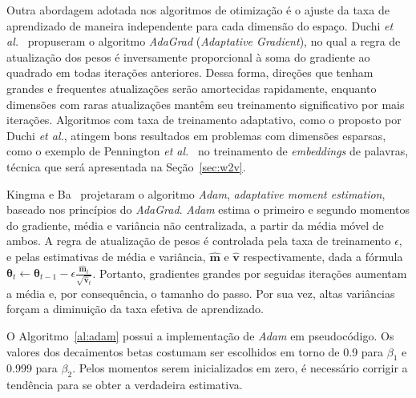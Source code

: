Outra abordagem adotada nos algoritmos de otimização é o ajuste da taxa de aprendizado de maneira independente para cada dimensão do espaço. Duchi \textit{et al.}~\cite{duchi11} propuseram o algoritmo \textit{AdaGrad} (\textit{Adaptative Gradient}), no qual a regra de atualização dos pesos é inversamente proporcional à soma do gradiente ao quadrado em todas iterações anteriores. Dessa forma, direções que tenham grandes e frequentes atualizações serão amortecidas rapidamente, enquanto dimensões com raras atualizações mantêm seu treinamento significativo por mais iterações. Algoritmos com taxa de treinamento adaptativo, como o proposto por Duchi \textit{et al.}, atingem bons resultados em problemas com dimensões esparsas, como o exemplo de Pennington \textit{et al.}~\cite{pennington14} no treinamento de \textit{embeddings} de palavras, técnica que será apresentada na Seção~\ref{sec:w2v}.

Kingma e Ba~\cite{kingma14} projetaram o algoritmo \textit{Adam}, \textit{adaptative moment estimation}, baseado nos princípios do \textit{AdaGrad}. \textit{Adam} estima o primeiro e segundo momentos do gradiente, média e variância não centralizada, a partir da média móvel de ambos. A regra de atualização de pesos é controlada pela taxa de treinamento $\epsilon$, e pelas estimativas de média e variância, $\mathbf{\hat{m}}$ e $\mathbf{\hat{v}}$ respectivamente, dada a fórmula $\boldsymbol{\theta}_{t} \gets \boldsymbol{\theta}_{t-1} - \epsilon \frac{\mathbf{\hat{m}}_{t}}{\sqrt{\mathbf{\hat{v}}_{t}}} $. Portanto, gradientes grandes por seguidas iterações aumentam a média e, por consequência, o tamanho do passo. Por sua vez, altas variâncias forçam a diminuição da taxa efetiva de aprendizado.

O Algoritmo~\ref{al:adam} possui a implementação de \textit{Adam} em pseudocódigo. Os valores dos decaimentos betas costumam ser escolhidos em torno de 0.9 para $\beta_{1}$ e 0.999 para $\beta_{2}$. Pelos momentos serem inicializados em zero, é necessário corrigir a tendência para se obter a verdadeira estimativa.

